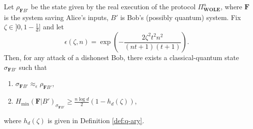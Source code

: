 \begin{lemma}
\label{lemma:wole_bob_dishonest}

Let $\rho_{\mathbf{F} B'}$ be the state given by the real execution of the protocol $\Pi^n_{\textbf{WOLE}}$, where $\mathbf{F}$ is the system saving Alice's inputs, $B'$ is Bob's (possibly quantum) system. Fix $\zeta \in ]0, 1-\frac{1}{d}]$ and let 
\begin{equation}
    \epsilon(\zeta, n) =\exp( -\frac{2 \zeta^2t^2n^2}{(nt+1)(t+1)}).
    \label{eq:epsilon}
\end{equation}Then, for any attack of a dishonest Bob, there exists a classical-quantum state $\sigma_{\mathbf{F} B'}$ such that

\begin{enumerate}
    \item $\sigma_{\mathbf{F} B'} \approx_{\epsilon} \rho_{\mathbf{F} B'}$,
    \item $ H_{\min}( \mathbf{F} | B' )_{\sigma_{\mathbf{F} B'}} \geq \frac{n\log d}{2}(1 - h_d(\zeta)) $,
\end{enumerate}
where $h_d(\zeta)$ is given in Definition \ref{def:q-ary}.

\end{lemma}

